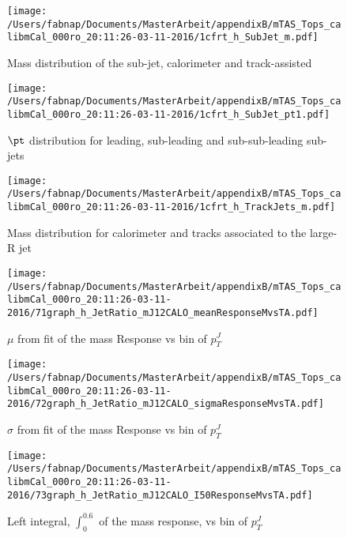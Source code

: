 \begin{figure}
 
\texttt{[image: /Users/fabnap/Documents/MasterArbeit/appendixB/mTAS\_Tops\_calibmCal\_000ro\_20:11:26-03-11-2016/1cfrt\_h\_SubJet\_m.pdf]}
\caption{Mass distribution of the sub-jet, calorimeter and track-assisted}
 
\end{figure}
% 
\begin{figure}
 
\texttt{[image: /Users/fabnap/Documents/MasterArbeit/appendixB/mTAS\_Tops\_calibmCal\_000ro\_20:11:26-03-11-2016/1cfrt\_h\_SubJet\_pt1.pdf]}
\caption{$\pt$ distribution for leading, sub-leading and sub-sub-leading sub-jets}
 
\end{figure}
\begin{figure}
 
\texttt{[image: /Users/fabnap/Documents/MasterArbeit/appendixB/mTAS\_Tops\_calibmCal\_000ro\_20:11:26-03-11-2016/1cfrt\_h\_TrackJets\_m.pdf]}
\caption{Mass distribution for calorimeter and tracks associated to the large-R jet}
 
\end{figure}

%

\begin{figure}

\texttt{[image: /Users/fabnap/Documents/MasterArbeit/appendixB/mTAS\_Tops\_calibmCal\_000ro\_20:11:26-03-11-2016/71graph\_h\_JetRatio\_mJ12CALO\_meanResponseMvsTA.pdf]}
\caption{$\mu $ from fit of the mass Response vs bin of  $p_{T}^{J}$}

\end{figure}
\begin{figure}

\texttt{[image: /Users/fabnap/Documents/MasterArbeit/appendixB/mTAS\_Tops\_calibmCal\_000ro\_20:11:26-03-11-2016/72graph\_h\_JetRatio\_mJ12CALO\_sigmaResponseMvsTA.pdf]}
\caption{$\sigma $ from fit of the mass Response vs bin of $p_{T}^{J}$}

\end{figure}

\begin{figure}

\texttt{[image: /Users/fabnap/Documents/MasterArbeit/appendixB/mTAS\_Tops\_calibmCal\_000ro\_20:11:26-03-11-2016/73graph\_h\_JetRatio\_mJ12CALO\_I50ResponseMvsTA.pdf]}
\caption{Left integral, $\int_{0}^{0.6} $ of the mass response, vs bin of  $p_{T}^{J}$}

\end{figure}

